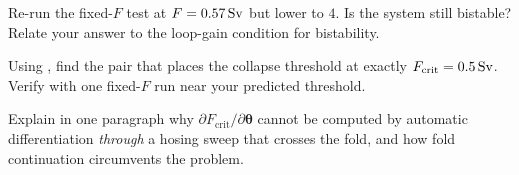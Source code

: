 \begin{exercise}
Re-run the fixed-$F$ test at $F=0.57\,\mathrm{Sv}$ but lower  to $4$. Is the system still
bistable? Relate your answer to the loop-gain condition for bistability.
\end{exercise}

\begin{exercise}
Using , find the  pair that places the
collapse threshold at exactly $F_{\mathrm{crit}}=0.5\,\mathrm{Sv}$. Verify with one fixed-$F$ run near your
predicted threshold.
\end{exercise}

\begin{exercise}[Differentiability]
Explain in one paragraph why $\partial F_{\mathrm{crit}}/\partial\boldsymbol{\theta}$ cannot be
computed by automatic differentiation \emph{through} a hosing sweep that crosses the fold, and how
fold continuation circumvents the problem.
\end{exercise}
